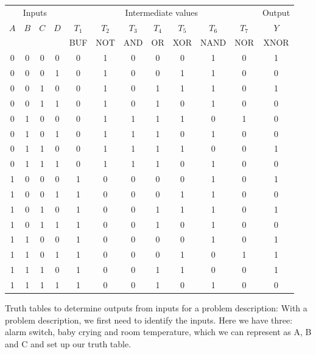 \documentclass[a4paper,12pt]{article}
\begin{document}
\begin{center}
\renewcommand{\arraystretch}{1.12}
\begin{tabular}{cccc|ccccccc|c}
\toprule
\multicolumn{4}{c|}{Inputs} & \multicolumn{7}{c|}{Intermediate values} & Output \\
\cmidrule(lr){1-4}\cmidrule(lr){5-11}\cmidrule(lr){12-12}
$A$ & $B$ & $C$ & $D$ & $T_1$ & $T_2$ & $T_3$ & $T_4$ & $T_5$ & $T_6$ & $T_7$ & $Y$ \\
{\scriptsize} & {\scriptsize} & {\scriptsize} & {\scriptsize} & \scriptsize BUF & \scriptsize NOT & \scriptsize AND & \scriptsize OR & \scriptsize XOR & \scriptsize NAND & \scriptsize NOR & \scriptsize XNOR \\
\midrule
0 & 0 & 0 & 0 & 0 & 1 & 0 & 0 & 0 & 1 & 0 & 1 \\
0 & 0 & 0 & 1 & 0 & 1 & 0 & 0 & 1 & 1 & 0 & 0 \\
0 & 0 & 1 & 0 & 0 & 1 & 0 & 1 & 1 & 1 & 0 & 1 \\
0 & 0 & 1 & 1 & 0 & 1 & 0 & 1 & 0 & 1 & 0 & 0 \\
0 & 1 & 0 & 0 & 0 & 1 & 1 & 1 & 1 & 0 & 1 & 0 \\
0 & 1 & 0 & 1 & 0 & 1 & 1 & 1 & 0 & 1 & 0 & 0 \\
0 & 1 & 1 & 0 & 0 & 1 & 1 & 1 & 1 & 0 & 0 & 1 \\
0 & 1 & 1 & 1 & 0 & 1 & 1 & 1 & 0 & 1 & 0 & 0 \\
1 & 0 & 0 & 0 & 1 & 0 & 0 & 0 & 0 & 1 & 0 & 1 \\
1 & 0 & 0 & 1 & 1 & 0 & 0 & 0 & 1 & 1 & 0 & 0 \\
1 & 0 & 1 & 0 & 1 & 0 & 0 & 1 & 1 & 1 & 0 & 1 \\
1 & 0 & 1 & 1 & 1 & 0 & 0 & 1 & 0 & 1 & 0 & 0 \\
1 & 1 & 0 & 0 & 1 & 0 & 0 & 0 & 0 & 1 & 0 & 1 \\
1 & 1 & 0 & 1 & 1 & 0 & 0 & 0 & 1 & 0 & 1 & 1 \\
1 & 1 & 1 & 0 & 1 & 0 & 0 & 1 & 1 & 0 & 0 & 1 \\
1 & 1 & 1 & 1 & 1 & 0 & 0 & 1 & 0 & 1 & 0 & 0 \\
\bottomrule
\end{tabular}
\end{center}
Truth tables to determine outputs from inputs for a problem description: With a problem description, we first need to identify the inputs. Here we have three: alarm switch, baby crying and room temperature, which we can represent as A, B and C and set up our truth table. \\\\
\end{document}
